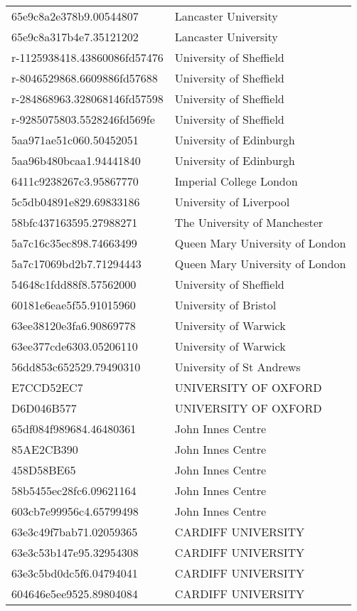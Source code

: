\begin{tabular}{ll}
65e9c8a2e378b9.00544807 & Lancaster University \\
65e9c8a317b4e7.35121202 & Lancaster University \\
r-1125938418.43860086fd57476 & University of Sheffield \\
r-8046529868.6609886fd57688 & University of Sheffield \\
r-284868963.328068146fd57598 & University of Sheffield \\
r-9285075803.5528246fd569fe & University of Sheffield \\
5aa971ae51c060.50452051 & University of Edinburgh \\
5aa96b480bcaa1.94441840 & University of Edinburgh \\
6411c9238267c3.95867770 & Imperial College London \\
5c5db04891e829.69833186 & University of Liverpool \\
58bfc437163595.27988271 & The University of Manchester \\
5a7c16c35ec898.74663499 & Queen Mary University of London \\
5a7c17069bd2b7.71294443 & Queen Mary University of London \\
54648c1fdd88f8.57562000 & University of Sheffield \\
60181e6eae5f55.91015960 & University of Bristol \\
63ee38120e3fa6.90869778 & University of Warwick \\
63ee377cde6303.05206110 & University of Warwick \\
56dd853c652529.79490310 & University of St Andrews \\
E7CCD52EC7 & UNIVERSITY OF OXFORD \\
D6D046B577 & UNIVERSITY OF OXFORD \\
65df084f989684.46480361 & John Innes Centre \\
85AE2CB390 & John Innes Centre \\
458D58BE65 & John Innes Centre \\
58b5455ec28fc6.09621164 & John Innes Centre \\
603cb7e99956c4.65799498 & John Innes Centre \\
63e3c49f7bab71.02059365 & CARDIFF UNIVERSITY \\
63e3c53b147e95.32954308 & CARDIFF UNIVERSITY \\
63e3c5bd0dc5f6.04794041 & CARDIFF UNIVERSITY \\
604646e5ee9525.89804084 & CARDIFF UNIVERSITY \\

\end{tabular}

